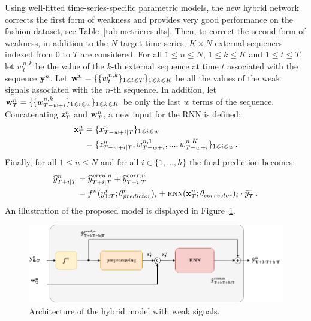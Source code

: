 \documentclass[review]{elsarticle}
\newcommand{\ts}{y}
\newcommand{\fullts}{{\bf \ts}}
\newcommand{\tspred}{\widehat{\ts}}
\newcommand{\stat}{f}
\newcommand{\statparam}{\theta_{predictor}}
\newcommand{\lag}{h}
\newcommand{\window}{w}
\newcommand{\meants}{\Bar{\ts}}
\newcommand{\rnnwindow}{{\bf \rnninput}}
\newcommand{\rnninput}{z}
\newcommand{\rnn}{\textsc{rnn}}
\newcommand{\rnnparam}{\theta_{corrector}}
\newcommand{\rnnmodel}{\textsc{rnn}}
\newcommand{\ws}{w}
\newcommand{\fullws}{{\bf \ws}}
\newcommand{\concatinput}{x}
\newcommand{\fullconcatinput}{{ \bf \concatinput}}
\begin{document}
Using well-fitted time-series-specific parametric models, the new hybrid network corrects the first form of weakness and provides very good performance on the fashion dataset, see Table~\ref{tab:metricresults}. Then, to correct the second form of weakness, in addition to the $N$ target time series, $K \times N$ external sequences indexed from $0$ to $T$ are considered. For all $1\leqslant n \leqslant N$, $1\leqslant k \leqslant K$ and  $1\leqslant t \leqslant T$, let $\ws^{n,k}_t$ be the value of the $k$-th external sequence at time $t$ associated with the sequence $\fullts^n$. Let  $\fullws^n = \{\{\ws_t^{n,k}\}_{1\leqslant t \leqslant T}\}_{1\leqslant k \leqslant K}$ be all the values of the weak signals associated with the $n$-th sequence. In addition, let $\fullws^n_T = \{\{\ws_{T-w+i}^{n,k}\}_{1\leqslant i \leqslant \window}\}_{1\leqslant k \leqslant K}$ be only the last $\window$ terms of the sequence. Concatenating $ \rnnwindow^n_T$ and $\fullws^n_T$, a new input for the RNN is defined:   
\begin{align*}
\fullconcatinput^n_T &= \{\concatinput^n_{T-w+i|T}\}_{1\leqslant i \leqslant w}\\
&= \{\rnninput^n_{T-w+i|T}, \ws^{n,1}_{T-w+i},...,\ws^{n,K}_{T-w+i}\}_{1\leqslant i \leqslant w}\,.
\end{align*}
Finally, for all $1\leqslant n \leqslant N$ and for all $i \in \{1,\ldots,\lag\}$ the final prediction becomes:
\begin{align}
\label{eq:withws:full:model}
\tspred^n_{T+i|T}  &= \tspred^{pred,n}_{T+i|T} +  \tspred^{corr,n}_{T+i|T}\\
& = \stat^n(\ts^n_{1:T};\statparam^n)_i +  \rnn(\fullconcatinput^n_T;\rnnparam)_i \cdot \meants^n_T\,.\nonumber
\end{align}
An illustration of the proposed  model is displayed in Figure~\ref{fig:architecture}.

\begin{figure}
  \centering
    \includegraphics[width=1\linewidth]{figure/HERMES_archi.png}
  \caption{Architecture of the hybrid model with weak signals.}
\label{fig:architecture}
\end{figure}
\end{document}
